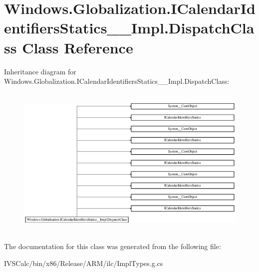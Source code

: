 \hypertarget{class_windows_1_1_globalization_1_1_i_calendar_identifiers_statics_____impl_1_1_dispatch_class}{}\section{Windows.\+Globalization.\+I\+Calendar\+Identifiers\+Statics\+\_\+\+\_\+\+Impl.\+Dispatch\+Class Class Reference}
\label{class_windows_1_1_globalization_1_1_i_calendar_identifiers_statics_____impl_1_1_dispatch_class}
Inheritance diagram for Windows.\+Globalization.\+I\+Calendar\+Identifiers\+Statics\+\_\+\+\_\+\+Impl.\+Dispatch\+Class\+:\begin{figure}[H]
\begin{center}
\leavevmode
\includegraphics[height=7.386091cm]{class_windows_1_1_globalization_1_1_i_calendar_identifiers_statics_____impl_1_1_dispatch_class}
\end{center}
\end{figure}


The documentation for this class was generated from the following file\+:\begin{DoxyCompactItemize}
\item 
I\+V\+S\+Calc/bin/x86/\+Release/\+A\+R\+M/ilc/Impl\+Types.\+g.\+cs\end{DoxyCompactItemize}
